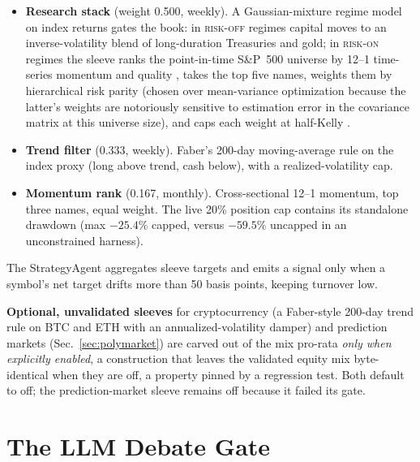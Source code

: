 \documentclass[10pt,twocolumn]{IEEEtran}
\begin{document}
\begin{itemize}
\item \textbf{Research stack} (weight 0.500, weekly). A Gaussian-mixture
regime model \cite{kritzman2012regime} on index returns gates the book:
in \textsc{risk-off} regimes capital moves to an inverse-volatility blend of
long-duration Treasuries and gold; in \textsc{risk-on} regimes the sleeve
ranks the point-in-time S\&P~500 universe by 12--1 time-series momentum
\cite{jegadeesh1993returns} and quality \cite{asness2019qmj}, takes the top
five names, weights them by hierarchical risk parity
\cite{lopezdeprado2016hrp} (chosen over mean-variance optimization
\cite{markowitz1952} because the latter's weights are notoriously sensitive to
estimation error in the covariance matrix at this universe size), and caps
each weight at half-Kelly
\cite{kelly1956}.
\item \textbf{Trend filter} (0.333, weekly). Faber's 200-day moving-average
rule \cite{faber2007tactical} on the index proxy (long above trend, cash
below), with a realized-volatility cap.
\item \textbf{Momentum rank} (0.167, monthly). Cross-sectional 12--1
momentum, top three names, equal weight. The live 20\% position cap contains
its standalone drawdown (max $-25.4\%$ capped, versus $-59.5\%$ uncapped in
an unconstrained harness).
\end{itemize}

The StrategyAgent aggregates sleeve targets and emits a signal only when a
symbol's net target drifts more than 50 basis points, keeping turnover low.

\textbf{Optional, unvalidated sleeves} for cryptocurrency (a Faber-style
200-day trend rule on BTC and ETH with an annualized-volatility damper) and
prediction markets (Sec.~\ref{sec:polymarket}) are carved out of the mix
pro-rata \emph{only when explicitly enabled}, a construction that leaves the
validated equity mix byte-identical when they are off, a property pinned
by a regression test. Both default to off; the prediction-market sleeve
remains off because it failed its gate.

\section{The LLM Debate Gate}
\label{sec:debate}
\end{document}
